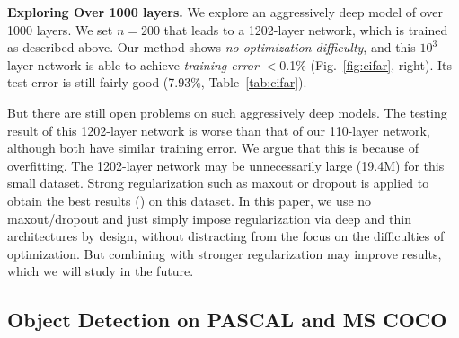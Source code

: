 \vspace{6pt}
\noindent\textbf{Exploring Over 1000 layers.}
We explore an aggressively deep model of over 1000 layers. We set $n=200$ that leads to a 1202-layer network, which is trained as described above. Our method shows \emph{no optimization difficulty}, and this $10^3$-layer network is able to achieve \emph{training error} $<$0.1\% (Fig.~\ref{fig:cifar}, right). Its test error is still fairly good (7.93\%, Table~\ref{tab:cifar}).

But there are still open problems on such aggressively deep models.
The testing result of this 1202-layer network is worse than that of our 110-layer network, although both have similar training error. We argue that this is because of overfitting.
The 1202-layer network may be unnecessarily large (19.4M) for this small dataset. Strong regularization such as maxout \cite{Goodfellow2013} or dropout \cite{Hinton2012} is applied to obtain the best results (\cite{Goodfellow2013,Lin2013,Lee2014,Romero2015}) on this dataset.
In this paper, we use no maxout/dropout and just simply impose regularization via deep and thin architectures by design, without distracting from the focus on the difficulties of optimization. But combining with stronger regularization may improve results, which we will study in the future.

\subsection{Object Detection on PASCAL and MS COCO}

